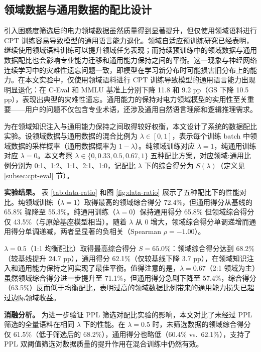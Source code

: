 \documentclass[fontset=fandol,type=master,campus=shenzhen,etitleauto=true]{hithesisbook}
\begin{document}
\subsection{领域数据与通用数据的配比设计}\label{ux9886ux57dfux6570ux636eux4e0eux901aux7528ux6570ux636eux7684ux914dux6bd4ux8bbeux8ba1}

引入困惑度筛选后的电力领域数据虽然质量得到显著提升，但仅使用领域语料进行 CPT 训练容易导致模型的通用语言能力退化。领域自适应预训练研究已经表明，继续使用领域语料训练可以提升领域任务表现\cite{ref6}；而持续预训练中的领域数据与通用数据配比也会影响专业能力迁移和通用能力保持之间的平衡\cite{ref52}。这一现象与神经网络连续学习中的灾难性遗忘问题一致，即模型在学习新分布时可能损害旧分布上的能力\cite{ref64}。在本文实验中，仅使用领域语料进行 CPT 训练导致模型的通用语言能力出现明显退化：在 C-Eval 和 MMLU 基准上分别下降 11.8 和 9.2 pp（GS 下降 10.5 pp），表现出典型的灾难性遗忘。通用能力的保持对电力领域模型的实用性至关重要------用户的问题不仅包含专业术语，还涉及通用自然语言理解和逻辑推理需求。

为在领域知识注入与通用能力保持之间取得较好权衡，本文设计了系统的数据配比实验。设领域数据与通用数据的混合比例为 $\lambda \in [0, 1]$，表示每个训练 batch 中领域数据的采样概率（通用数据概率为 $1-\lambda$）。纯领域训练对应 $\lambda = 1$，纯通用训练对应 $\lambda = 0$。本文考察 $\lambda \in \{0, 0.33, 0.5, 0.67, 1\}$ 五种配比方案，对应领域:通用比例分别为 0:1、1:2、1:1、2:1、1:0，记配比 $\lambda$ 下的综合得分为 $S(\lambda)$（定义见 \ref{subsec:cpt-eval} 节）。

\textbf{实验结果。} 表 \ref{tab:data-ratio} 和图 \ref{fig:data-ratio} 展示了五种配比下的性能对比。纯领域训练（$\lambda = 1$）取得最高的领域综合得分 72.4\%，但通用得分从基线的 65.8\% 骤降至 55.3\%。纯通用训练（$\lambda = 0$）保持通用得分 65.8\% 但领域综合得分仅 43.5\%（与原始基座模型相当）。随着 $\lambda$ 从 0 增大，领域综合得分单调递增而通用得分单调递减，两者呈显著的负相关（Spearman $\rho = -1.00$）。

$\lambda = 0.5$（1:1 均衡配比）取得最高综合得分 $S = 65.0\%$：领域综合得分达到 68.2\%（较基线提升 24.7 pp），通用得分 62.1\%（仅较基线下降 3.7 pp），在领域知识注入和通用能力保持之间实现了最佳平衡。值得注意的是，$\lambda = 0.67$（2:1 领域为主）虽然领域综合得分进一步提升至 71.1\%，但通用得分急剧下降至 57.4\%，综合得分（63.5\%）反而低于均衡配比，表明过高的领域数据比例带来的通用能力损失已超过边际领域收益。

\textbf{消融分析。} 为进一步验证 PPL 筛选对配比实验的影响，本文对比了未经过 PPL 筛选的全量语料在相同 $\lambda$ 下的性能。在 $\lambda = 0.5$ 时，未筛选数据的领域综合得分仅 61.5\%（低于筛选后的 68.2\%），通用得分也略低（60.4\% vs.\ 62.1\%），支持了 PPL 双阈值筛选对数据质量的提升作用在混合训练中仍然有效。
\end{document}

